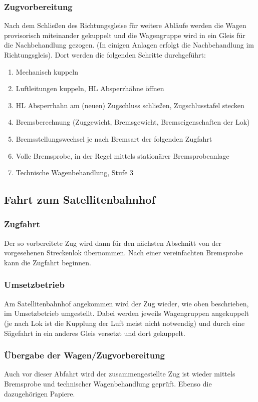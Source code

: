 \subsubsection{Zugvorbereitung}\label{sec:Zugvorbereitung}
Nach dem Schließen des Richtungsgleise für weitere Abläufe werden die Wagen provisorisch miteinander gekuppelt und die Wagengruppe wird in ein Gleis für die Nachbehandlung gezogen. (In einigen Anlagen erfolgt die Nachbehandlung im Richtungsgleis). Dort werden die folgenden Schritte durchgeführt:
\begin{enumerate}
    \item Mechanisch kuppeln
    \item Luftleitungen kuppeln, \acrshort{HL} Absperrhähne öffnen
    \item \acrshort{HL} Absperrhahn am (neuen) \gls{Zugschluss} schließen, Zugschlusstafel stecken
    \item Bremsberechnung (Zuggewicht, Bremsgewicht, Bremseigenschaften der Lok)
    \item Bremsstellungswechsel je nach Bremsart der folgenden \gls{Zugfahrt}
    \item Volle \gls{Bremsprobe}, in der Regel mittels stationärer Bremsprobeanlage
    \item Technische Wagenbehandlung, Stufe 3
\end{enumerate}
\subsection{Fahrt zum Satellitenbahnhof}
\subsubsection{Zugfahrt}
Der so vorbereitete Zug wird dann für den nächsten Abschnitt von der vorgesehenen Streckenlok übernommen. Nach einer vereinfachten Bremsprobe kann die \gls{Zugfahrt} beginnen.\par
\subsubsection{Umsetzbetrieb}
Am Satellitenbahnhof angekommen wird der Zug wieder, wie oben beschrieben, im Umsetzbetrieb umgestellt. Dabei werden
jeweils Wagengruppen angekuppelt (je nach Lok ist die Kupplung der Luft meist nicht notwendig) und durch eine Sägefahrt in ein anderes Gleis versetzt und dort gekuppelt.
\subsubsection{Übergabe der Wagen/Zugvorbereitung}
Auch  vor  dieser  Abfahrt  wird der  zusammengestellte  Zug  ist  wieder mittels Bremsprobe und technischer Wagenbehandlung geprüft. Ebenso die dazugehörigen Papiere.
